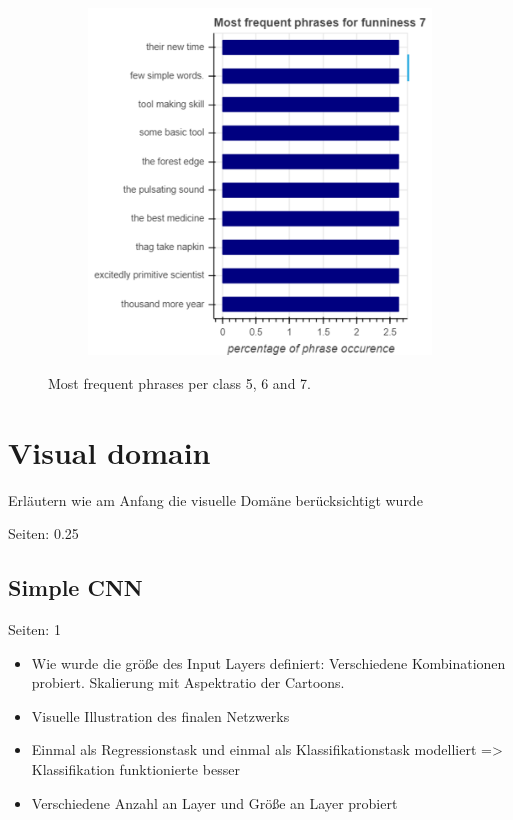 \documentclass[draft,final,oneside]{vutinfth} %
\begin{document}
\begin{figure}
\begin{subfigure}[b]{0.45\textwidth}
\centering
\includegraphics[width=1.0\textwidth]{graphics/phrases/funniness_7}
\end{subfigure}

\caption{Most frequent phrases per class 5, 6 and 7.}
\label{fig:phraseocc2}

\end{figure}

\section{Visual domain}

Erläutern wie am Anfang die visuelle Domäne berücksichtigt wurde

Seiten: 0.25

\subsection{Simple CNN}

Seiten: 1

\begin{itemize}
\item Wie wurde die größe des Input Layers definiert: Verschiedene Kombinationen probiert. Skalierung mit Aspektratio der Cartoons. 
\item Visuelle Illustration des finalen Netzwerks
\item Einmal als Regressionstask und einmal als Klassifikationstask modelliert => Klassifikation funktionierte besser
\item Verschiedene Anzahl an Layer und Größe an Layer probiert
\end{itemize}
\end{document}
